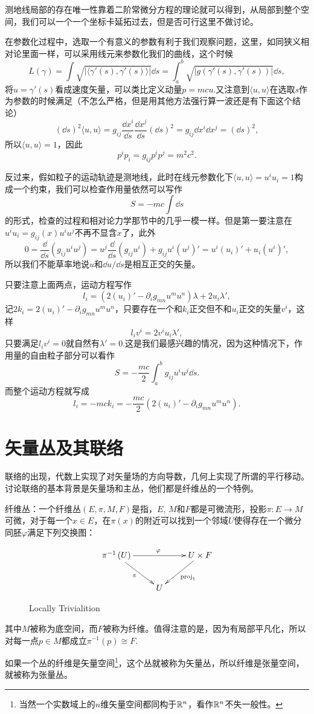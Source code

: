 测地线局部的存在唯一性靠着二阶常微分方程的理论就可以得到，从局部到整个空间，我们可以一个一个坐标卡延拓过去，但是否可行这里不做讨论。

在参数化过程中，选取一个有意义的参数有利于我们观察问题，这里，如同狭义相对论里面一样，可以采用线元来参数化我们的曲线，这个时候
\[
	L(\gamma)=\int \sqrt{|\langle\gamma'(s),\gamma'(s)\rangle|}\dd s=\int_a^b \sqrt{|g(\gamma'(s),\gamma'(s))|}\dd s,
\]
将$u=\gamma'(s)$看成速度矢量，可以类比定义动量$p=mcu$.又注意到$\langle u,u\rangle$在选取$s$作为参数的时候满足（不怎么严格，但是用其他方法强行算一波还是有下面这个结论）
\[
	(\dd s)^2\langle u, u\rangle=g_{ij}\frac{\dd x^i}{\dd s}\frac{\dd x^j}{\dd s}(\dd s)^2=g_{ij}\dd x^i\dd x^j=(\dd s)^2,
\]
所以$\langle u, u\rangle=1$，因此
\[
	p^ip_i=g_{ij}p^i p^j=m^2c^2.
\]

反过来，假如粒子的运动轨迹是测地线，此时在线元参数化下$\langle u,u\rangle=u^iu_i=1$构成一个约束，我们可以检查作用量依然可以写作
\[
	S=-mc \int \dd s
\]
的形式，检查的过程和相对论力学那节中的几乎一模一样。但是第一要注意在$u^i u_i=g_{ij}(x) u^i u^j$不再不显含$x$了，此外
\[
	0=\frac{\dd}{\dd s}\left(g_{ij}u^iu^j\right)=u^j\frac{\dd}{\dd s}\left(g_{ij}u^i\right)+g_{ij}u^i(u^j)'=u^i(u_i)'+u_i(u^i)',
\]
所以我们不能草率地说$u$和$\dd u /\dd s$是相互正交的矢量。

只要注意上面两点，运动方程写作
\[
	l_i=(2(u_i)'-\partial_ig_{mn}u^mu^n)\lambda+2u_i \lambda',
\]
记$2k_i=2(u_i)'-\partial_ig_{mn}u^mu^n$，只要存在一个和$k_i$正交但不和$u_i$正交的矢量$v^i$，这样
\[
	l_iv^i=2v^iu_i \lambda',
\]
只要满足$l_iv^i=0$就自然有$\lambda'=0$.这是我们最感兴趣的情况，因为这种情况下，作用量的自由粒子部分可以看作
\[
	S=-\frac{mc}{2}\int_a^b g_{ij}u^i u^j \dd s.
\]
而整个运动方程就写成
\[
	l_i=-mck_i=-\frac{mc}{2}\left(2(u_i)'-\partial_ig_{mn}u^mu^n\right).
\]

\section{矢量丛及其联络}

联络的出现，代数上实现了对矢量场的方向导数，几何上实现了所谓的平行移动。讨论联络的基本背景是矢量场和主丛，他们都是纤维丛的一个特例。

\begin{defi}纤维丛：一个纤维丛$(E,\pi,M,F)$是指，$E$, $M$和$F$都是可微流形，投影$\pi:E\to M$可微，对于每一个$x\in E$，在$\pi(x)$的附近可以找到一个邻域$U$使得存在一个微分同胚$\varphi$满足下列交换图：
\begin{figure}[htp]
	\centering
	\[
		\xymatrix{
			\pi^{-1}\left(U\right)\ar[rr]^\varphi \ar[dr]_\pi&&U\times F \ar[dl]^{\mathrm{proj}_1}\\
			&U&
			}
	\]
	\caption{Locally Trivialition}
\end{figure}

其中$M$被称为底空间，而$F$被称为纤维。值得注意的是，因为有局部平凡化，所以对每一点$p\in M$都成立$\pi^{-1}(p)\cong F$.
\end{defi}
如果一个丛的纤维是矢量空间\footnote{当然一个实数域上的$n$维矢量空间都同构于$\mathbb{R}^n$，看作$\mathbb{R}^n$不失一般性。}，这个丛就被称为矢量丛，所以纤维是张量空间，就被称为张量丛。

